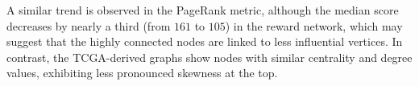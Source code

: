 A similar trend is observed in the PageRank metric, although the median score decreases by nearly a third (from $161$ to $105$) in the reward network, which may suggest that the highly connected nodes are linked to less influential vertices. In contrast, the TCGA-derived graphs show nodes with similar centrality and degree values, exhibiting less pronounced skewness at the top.





